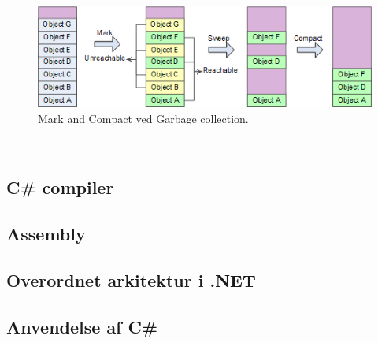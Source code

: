 \begin{figure}[h]
\centering
\includegraphics[width=0.8\linewidth]{figs/markandsweep}
\caption{Mark and Compact ved Garbage collection.}
\label{fig:markandsweep}
\end{figure}

\

\subsection{C\# compiler}

\subsection{Assembly}

\subsection{Overordnet arkitektur i .NET}

\subsection{Anvendelse af C\#}